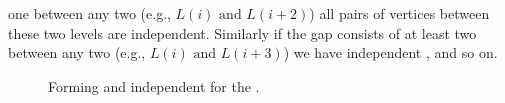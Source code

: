 one \level between any two \levels (e.g., $L(i) \mbox{ and } L(i+2)$) all
pairs of vertices between these two levels are \DONE independent. Similarly
if the gap consists of at least two \levels between any two
\levels (e.g., $L(i) \mbox{ and } L(i+3)$) we have \DTWO independent
\levels, and so on.
 \begin{figure}[t]
 	\centering
 	\hspace{2.5em}
 	\caption{Forming \DONE and \DTWO independent \levelGroups for the \stex.}
 	\label{fig:2d-7pt_d1_d2}
 \end{figure}
 
